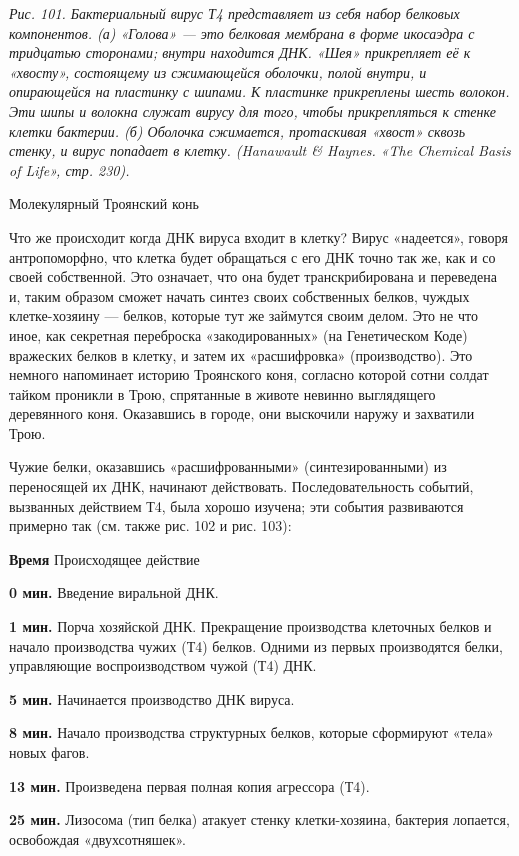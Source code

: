 \documentclass[../main.tex]{subfiles}
\begin{document}
\emph{Рис. 101. Бактериальный вирус Т4 представляет из себя набор белковых компонентов. (а) «Голова» --- это белковая мембрана в форме икосаэдра с тридцатью сторонами; внутри находится ДНК. «Шея» прикрепляет её к «хвосту», состоящему из сжимающейся оболочки, полой внутри, и опирающейся на пластинку с шипами. К пластинке прикреплены шесть волокон. Эти шипы и волокна служат вирусу для того, чтобы прикрепляться к стенке клетки бактерии. (б) Оболочка сжимается, протаскивая «хвост» сквозь стенку, и вирус попадает в клетку. (Hanawault \& Haynes. «The Chemical Basis of Life», стр. 230).}

Молекулярный Троянский конь

Что же происходит когда ДНК вируса входит в клетку? Вирус «надеется», говоря антропоморфно, что клетка будет обращаться с его ДНК точно так же, как и со своей собственной. Это означает, что она будет транскрибирована и переведена и, таким образом сможет начать синтез своих собственных белков, чуждых клетке-хозяину --- белков, которые тут же займутся своим делом. Это не что иное, как секретная переброска «закодированных» (на Генетическом Коде) вражеских белков в клетку, и затем их «расшифровка» (производство). Это немного напоминает историю Троянского коня, согласно которой сотни солдат тайком проникли в Трою, спрятанные в животе невинно выглядящего деревянного коня. Оказавшись в городе, они выскочили наружу и захватили Трою.

Чужие белки, оказавшись «расшифрованными» (синтезированными) из переносящей их ДНК, начинают действовать. Последовательность событий, вызванных действием Т4, была хорошо изучена; эти события развиваются примерно так (см. также рис. 102 и рис. 103):

\textbf{Время} Происходящее действие

\textbf{0 мин.} Введение виральной ДНК.

\textbf{1 мин.} Порча хозяйской ДНК. Прекращение производства клеточных белков и начало производства чужих (Т4) белков. Одними из первых производятся белки, управляющие воспроизводством чужой (Т4) ДНК.

\textbf{5 мин.} Начинается производство ДНК вируса.

\textbf{8 мин.} Начало производства структурных белков, которые сформируют «тела» новых фагов.

\textbf{13 мин.} Произведена первая полная копия агрессора (Т4).

\textbf{25 мин.} Лизосома (тип белка) атакует стенку клетки-хозяина, бактерия лопается, освобождая «двухсотняшек».
\end{document}
